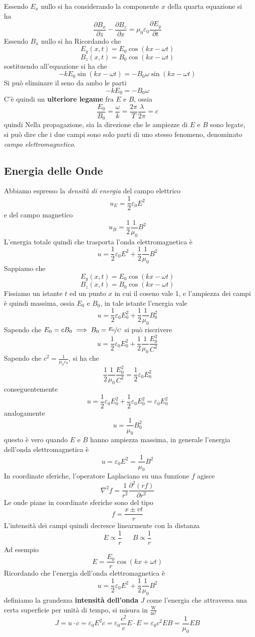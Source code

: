 \documentclass[10pt, letterpaper]{report}
\begin{document}
Essendo $E_x$ nullo si ha 
considerando la componente $x$ della quarta equazione si ha 
$$ \frac{\partial B_x}{\partial z}- \frac{\partial B_z}{\partial x}=\mu_0\varepsilon_0\frac{\partial E_y}{\partial t}$$
Essendo $B_x$ nullo si ha 
Ricordando che 
$$ 
E_y(x,t)=E_0\cos(kx-\omega t)
$$
$$  B_z(x,t)=B_0\cos(kx-\omega t)
$$
sostituendo all'equazione si ha che 
$$ -kE_0\sin(kx-\omega t)=-B_0\omega \sin(kx-\omega t)$$
Si può eliminare il seno da ambo le parti
$$ -kE_0=-B_0\omega$$
C'è quindi un \textbf{ulteriore legame} fra $E$ e $B$, ossia 
$$ \frac{E_0}{B_0}=\frac{\omega}{k}=\frac{2\pi}{T}\frac{\lambda}{2\pi}=c$$
quindi 
Nella propagazione, sia la direzione che le ampiezze di $E$ e $B$ sono legate, si può dire che i due campi sono solo parti di uno stesso fenomeno, denominato \textit{campo elettromagnetico}.
\subsection{Energia delle Onde}
Abbiamo espresso la \textit{densità di energia} del campo elettrico 
$$ u_E=\frac{1}{2}\varepsilon_0 E^2$$
e del campo magnetico 
$$ u_B=\frac{1}{2}\frac{1}{\mu_0}B^2$$
L'energia totale quindi che trasporta l'onda elettromagnetica è 
$$u=\frac{1}{2}\varepsilon_0 E^2+\frac{1}{2}\frac{1}{\mu_0}B^2$$
Sappiamo che 
$$ 
E_y(x,t)=E_0\cos(kx-\omega t)
$$
$$  B_z(x,t)=B_0\cos(kx-\omega t)
$$
Fissiamo un istante $t$ ed un punto $x$ in cui il coseno vale 1, e l'ampiezza dei campi è quindi massima, ossia $E_0$ e $B_0$, in tale istante l'energia vale 
$$u=\frac{1}{2}\varepsilon_0 E_0^2+\frac{1}{2}\frac{1}{\mu_0}B_0^2$$
Sapendo che $E_0=cB_0\implies B_0=\nicefrac{E_0}{C}$ si può riscrivere 
$$u=\frac{1}{2}\varepsilon_0 E_0^2+\frac{1}{2}\frac{1}{\mu_0}\frac{E_0^2}{C^2}$$
Sapendo che $c^2=\frac{1}{\mu_0\varepsilon_0}$, si ha che 
$$\frac{1}{2}\frac{1}{\mu_0}\frac{E_0^2}{C^2}= \frac{1}{2}\varepsilon_0 E_0^2$$
conseguentemente 
$$ u=\frac{1}{2}\varepsilon_0 E_0^2+\frac{1}{2}\varepsilon_0 E_0^2=\varepsilon_0E_0^2$$
analogamente 
$$ u=\frac{1}{\mu_0}B_0^2$$
questo è vero quando $E$ e $B$ hanno ampiezza massima, in generale l'energia dell'onda elettromagnetica è$$ u=\varepsilon_0E^2=\frac{1}{\mu_0}B^2$$
In coordinate sferiche, l'operatore Laplaciano su una funzione $f$ agisce 
$$\nabla^2f=\frac{1}{r^2}\frac{\partial^2 (rf)}{\partial r^2} $$
Le onde piane in coordinate sferiche sono del tipo 
$$f=\frac{x\pm vt}{r} $$
L'intensità dei campi quindi decresce linearmente con la distanza 
$$ E\propto \frac{1}{r} \ \ \ \ \ \ \  
B\propto \frac{1}{r}$$
Ad esempio 
$$ E=\frac{E_0}{r}\cos(kx+\omega t)$$
Ricordando che l'energia dell'onda elettromagnetica è 
$$u=\frac{1}{2}\varepsilon_0E^2+\frac{1}{2}\frac{1}{\mu_0}B^2 $$
definiamo la grandezza \textbf{intensità dell'onda} $J$ come l'energia che attraversa una certa superficie per unità di tempo, si misura in $\frac{\text{W}}{\text{m}^2}$
$$ J=u\cdot c=\varepsilon_0E^2c=\varepsilon_0\frac{c^2}{c}E\cdot E=\varepsilon_0c^2EB=\frac{1}{\mu_0}EB$$
\end{document}

